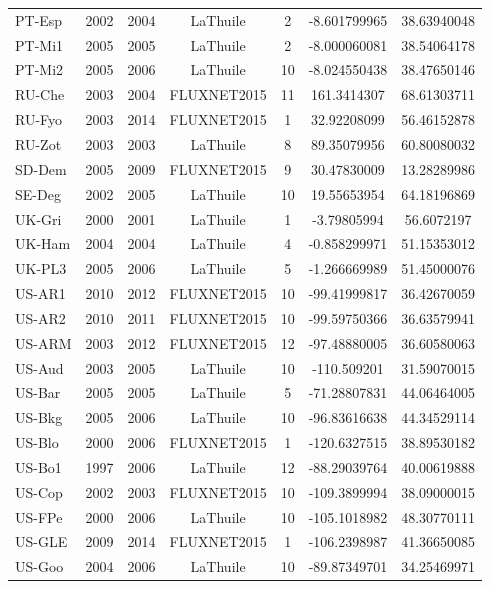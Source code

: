\begin{center}
\begin{longtable}{lcccccc}
PT-Esp & 2002 & 2004 & LaThuile    & 2      & -8.601799965 & 38.63940048  \\
PT-Mi1 & 2005 & 2005 & LaThuile    & 2      & -8.000060081 & 38.54064178  \\
PT-Mi2 & 2005 & 2006 & LaThuile    & 10     & -8.024550438 & 38.47650146  \\
RU-Che & 2003 & 2004 & FLUXNET2015 & 11     & 161.3414307  & 68.61303711  \\
RU-Fyo & 2003 & 2014 & FLUXNET2015 & 1      & 32.92208099  & 56.46152878  \\
RU-Zot & 2003 & 2003 & LaThuile    & 8      & 89.35079956  & 60.80080032  \\
SD-Dem & 2005 & 2009 & FLUXNET2015 & 9      & 30.47830009  & 13.28289986  \\
SE-Deg & 2002 & 2005 & LaThuile    & 10     & 19.55653954  & 64.18196869  \\
UK-Gri & 2000 & 2001 & LaThuile    & 1      & -3.79805994  & 56.6072197   \\
UK-Ham & 2004 & 2004 & LaThuile    & 4      & -0.858299971 & 51.15353012  \\
UK-PL3 & 2005 & 2006 & LaThuile    & 5      & -1.266669989 & 51.45000076  \\
US-AR1 & 2010 & 2012 & FLUXNET2015 & 10     & -99.41999817 & 36.42670059  \\
US-AR2 & 2010 & 2011 & FLUXNET2015 & 10     & -99.59750366 & 36.63579941  \\
US-ARM & 2003 & 2012 & FLUXNET2015 & 12     & -97.48880005 & 36.60580063  \\
US-Aud & 2003 & 2005 & LaThuile    & 10     & -110.509201  & 31.59070015  \\
US-Bar & 2005 & 2005 & LaThuile    & 5      & -71.28807831 & 44.06464005  \\
US-Bkg & 2005 & 2006 & LaThuile    & 10     & -96.83616638 & 44.34529114  \\
US-Blo & 2000 & 2006 & FLUXNET2015 & 1      & -120.6327515 & 38.89530182  \\
US-Bo1 & 1997 & 2006 & LaThuile    & 12     & -88.29039764 & 40.00619888  \\
US-Cop & 2002 & 2003 & FLUXNET2015 & 10     & -109.3899994 & 38.09000015  \\
US-FPe & 2000 & 2006 & LaThuile    & 10     & -105.1018982 & 48.30770111  \\
US-GLE & 2009 & 2014 & FLUXNET2015 & 1      & -106.2398987 & 41.36650085  \\
US-Goo & 2004 & 2006 & LaThuile    & 10     & -89.87349701 & 34.25469971  \\

\end{longtable}
\end{center}
